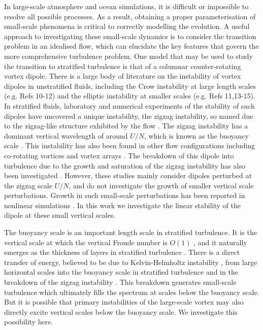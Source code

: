 In large-scale atmosphere and ocean simulations, it is difficult or impossible to resolve all possible processes. As a result, obtaining a proper parameterisation of small-scale phenomena is critical to correctly modelling the evolution. A useful approach to investigating these small-scale dynamics is to consider the transition problem in an idealised flow, which can elucidate the key features that govern the more comprehensive turbulence problem. One model that may be used to study the transition to stratified turbulence is that of a columnar counter-rotating vortex dipole. There is a large body of literature on the instability of vortex dipoles in unstratified fluids, including the Crow instability at large length scales (e.g. Refs 10-12\nocite{crow1970,widnall1974,leweke1998b}) and the elliptic instability at smaller scales (e.g. Refs 11,13-15\nocite{widnall1974,pierrehumbert1986,baily1986,waleffe1990}). In stratified fluids, laboratory and numerical experiments of the stability of such dipoles have uncovered a unique instability, the zigzag instability, so named due to the zigzag-like structure exhibited by the flow \cite{bc2000a,bc2000c}. The zigzag instability has a dominant vertical wavelength of around $U/N$, which is known as the buoyancy scale \cite{waite2011}. This instability has also been found in other flow configurations including co-rotating vortices \cite{otheguybc} and vortex arrays \cite{delonclebc2011}. The breakdown of this dipole into turbulence due to the growth and saturation of the zigzag instability has also been investigated \cite{waitesmol2008,augierbillant2011,delonclebc2008}. However, these studies mainly consider dipoles perturbed at the zigzag scale $U/N$, and do not investigate the growth of smaller vertical scale perturbations. Growth in such small-scale perturbations has been reported in nonlinear simulations \cite{waitesmol2008}. In this work we investigate the linear stability of the dipole at these small vertical scales. 

The buoyancy scale is an important length scale in stratified turbulence. It is the vertical scale at which the vertical Froude number is $O(1)$ \cite{bc2001}, and it naturally emerges as the thickness of layers in stratified turbulence \cite{bc2001,waitebartello2004}. There is a direct transfer of energy, believed to be due to Kelvin-Helmholtz instability \cite{waite2011,augier2012}, from large horizontal scales into the buoyancy scale in stratified turbulence \cite{waite2011} and in the breakdown of the zigzag instability \cite{augier2012}. This breakdown generates small-scale turbulence which ultimately fills the spectrum at scales below the buoyancy scale. But it is possible that primary instabilities of the large-scale vortex may also directly excite vertical scales below the buoyancy scale. We investigate this possibility here.  

